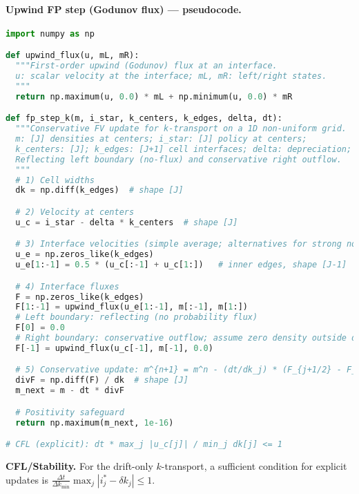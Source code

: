 ﻿\documentclass[11pt,letterpaper,oneside]{article}
\numberwithin{equation}{section}
\newcommand{\1}{\mathbf{1}}
\begin{document}
\paragraph{Upwind FP step (Godunov flux) --- pseudocode.}
\begin{lstlisting}[language=Python,caption={1D upwind FV update for k-transport (reflecting at k=0). Explicit handling of centers and edges for robustness on non-uniform grids.},label={lst:fvm_k_transport}]
import numpy as np

def upwind_flux(u, mL, mR):
  """First-order upwind (Godunov) flux at an interface.
  u: scalar velocity at the interface; mL, mR: left/right states.
  """
  return np.maximum(u, 0.0) * mL + np.minimum(u, 0.0) * mR

def fp_step_k(m, i_star, k_centers, k_edges, delta, dt):
  """Conservative FV update for k-transport on a 1D non-uniform grid.
  m: [J] densities at centers; i_star: [J] policy at centers;
  k_centers: [J]; k_edges: [J+1] cell interfaces; delta: depreciation; dt: timestep.
  Reflecting left boundary (no-flux) and conservative right outflow.
  """
  # 1) Cell widths
  dk = np.diff(k_edges)  # shape [J]

  # 2) Velocity at centers
  u_c = i_star - delta * k_centers  # shape [J]

  # 3) Interface velocities (simple average; alternatives for strong non-uniformity)
  u_e = np.zeros_like(k_edges)
  u_e[1:-1] = 0.5 * (u_c[:-1] + u_c[1:])   # inner edges, shape [J-1]

  # 4) Interface fluxes
  F = np.zeros_like(k_edges)
  F[1:-1] = upwind_flux(u_e[1:-1], m[:-1], m[1:])
  # Left boundary: reflecting (no probability flux)
  F[0] = 0.0
  # Right boundary: conservative outflow; assume zero density outside domain
  F[-1] = upwind_flux(u_c[-1], m[-1], 0.0)

  # 5) Conservative update: m^{n+1} = m^n - (dt/dk_j) * (F_{j+1/2} - F_{j-1/2})
  divF = np.diff(F) / dk  # shape [J]
  m_next = m - dt * divF

  # Positivity safeguard
  return np.maximum(m_next, 1e-16)

# CFL (explicit): dt * max_j |u_c[j]| / min_j dk[j] <= 1
\end{lstlisting}

\begin{tcolorbox}[mathstyle]
\textbf{CFL/Stability.} For the drift-only $k$-transport, a sufficient condition for explicit updates is $\displaystyle \frac{\Delta t}{\Delta k_\mathrm{min}}\max_j |i^*_j - \delta k_j| \le 1$.
\end{tcolorbox}
\end{document}
